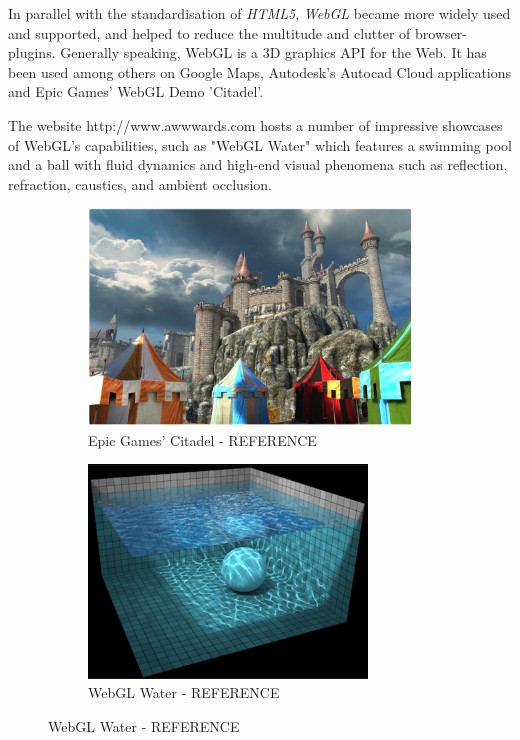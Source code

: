 \documentclass[a4paper,11pt,twoside]{article}
\begin{document}
In parallel with the standardisation of \textit{HTML5}, \textit{WebGL} became more widely used and supported, and helped to reduce the multitude and clutter of browser-plugins. Generally speaking, WebGL is a 3D graphics API for the Web. It has been used among others on Google Maps, Autodesk's Autocad Cloud applications and Epic Games' WebGL Demo 'Citadel'.

The website http://www.awwwards.com hosts a number of impressive showcases of WebGL's capabilities, such as "WebGL Water"  which features a swimming pool and a ball with fluid dynamics and high-end visual phenomena such as reflection, refraction, caustics, and ambient occlusion.

\begin{figure}
\centering
\begin{subfigure}{.5\textwidth}
  \centering
  \includegraphics[width=86mm]{graphics/webGL_01.png}
\caption{Epic Games' Citadel - REFERENCE}

  \label{fig:sub1}
\end{subfigure}%
\begin{subfigure}{.5\textwidth}
  \centering
  \includegraphics[width=74mm]{graphics/webGL_02.png}
	\caption{WebGL Water - REFERENCE}

  \label{fig:sub2}
\end{subfigure}


\end{figure}
\end{document}
